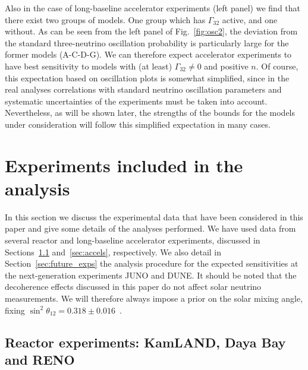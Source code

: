 \documentclass[aps, prd, onecolumn, tightenlines, notitlepage, superscriptaddress, nofootinbib, preprintnumbers, floatfix,showkeys,11pt]{revtex4-2}
\begin{document}
Also in the case of long-baseline accelerator experiments (left panel) we find that there exist two groups of models. One group which has $\Gamma_{32}$ active, and one without. As can be seen from the left panel of Fig.~\ref{fig:osc2}, the deviation from the standard three-neutrino oscillation probability is particularly large for the former models (A-C-D-G). We can therefore expect accelerator experiments to have best sensitivity to models with (at least) $\Gamma_{32} \neq 0$ and positive $n$. Of course, this expectation based on oscillation plots is somewhat simplified, since in the real analyses correlations with standard neutrino oscillation parameters and systematic uncertainties of the experiments must be taken into account. Nevertheless, as will be shown later, the strengths of the bounds for the models under consideration will follow this simplified expectation in many cases.



\section{Experiments included in the analysis}
\label{sec:experiments}

In this section we discuss the experimental data that have been considered in this paper and give some details of the analyses performed. We have used data from several reactor and long-baseline accelerator experiments, discussed in Sections~\ref{sec:reacs} and~\ref{sec:accels}, respectively. We also detail in Section~\ref{sec:future_exps} the analysis procedure for the expected sensitivities at the next-generation experiments JUNO and DUNE. It should be noted that the decoherence effects discussed in this paper do not affect solar neutrino measurements. We will therefore always impose a prior on the solar mixing angle, fixing $\sin^2\theta_{12} = 0.318\pm0.016$~\cite{deSalas:2020pgw}.

\subsection{Reactor experiments: KamLAND, Daya Bay and RENO}
\label{sec:reacs}
\end{document}
